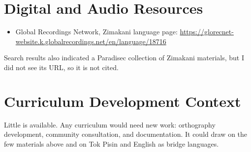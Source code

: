 \documentclass[12pt]{article}
\begin{document}
\section{Digital and Audio Resources}
\begin{itemize}
\item Global Recordings Network, Zimakani language page: \url{https://glorecnet-website.k.globalrecordings.net/en/language/18716}
\end{itemize}
Search results also indicated a Paradisec collection of Zimakani materials, but I did not see its URL, so it is not cited.

\section{Curriculum Development Context}
Little is available. Any curriculum would need new work: orthography development, community consultation, and documentation. It could draw on the few materials above and on Tok Pisin and English as bridge languages.
\end{document}
